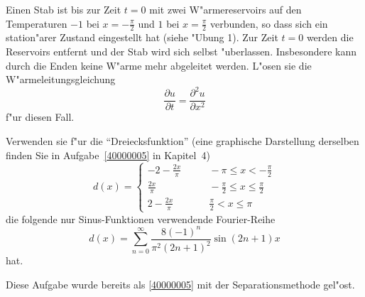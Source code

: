 Einen Stab ist bis zur Zeit $t=0$ mit zwei
W"armereservoirs auf den Temperaturen $-1$ bei $x=-\frac{\pi}2$ und
$1$ bei $x=\frac{\pi}2$ verbunden,
so dass sich ein station"arer Zustand eingestellt hat (siehe
"Ubung 1). Zur Zeit $t=0$ werden die Reservoirs entfernt und der
Stab wird sich selbst "uberlassen. Insbesondere kann durch die
Enden keine W"arme mehr abgeleitet werden. L"osen sie die
W"armeleitungsgleichung
\[
\frac{\partial u}{\partial t}=\frac{\partial^2 u}{\partial x^2}
\]
f"ur diesen Fall.

\begin{hinweis}
Verwenden sie f"ur die
``Dreiecksfunktion''
(eine graphische Darstellung derselben finden Sie in Aufgabe~\ref{40000005}
in Kapitel~4)
\[
d(x)
=
\begin{cases}
\displaystyle-2-\frac{2x}{\pi}&\qquad \displaystyle-\pi\le x <-\frac{\pi}2\\
\displaystyle\frac{2x}{\pi}&\qquad \displaystyle-\frac{\pi}2\le x\le \frac{\pi}2\\
\displaystyle2-\frac{2x}{\pi}&\qquad \displaystyle \frac{\pi}2<x\le \pi
\end{cases}
\]
die folgende nur Sinus-Funktionen
verwendende Fourier-Reihe
\[
d(x)=\sum_{n=0}^\infty \frac{8(-1)^n}{\pi^2(2n+1)^2}\sin (2n+1)x
\]
hat.
\end{hinweis}

\begin{hinweis}
Diese Aufgabe wurde bereits als \ref{40000005} mit der Separationsmethode
gel"ost.
\end{hinweis}


